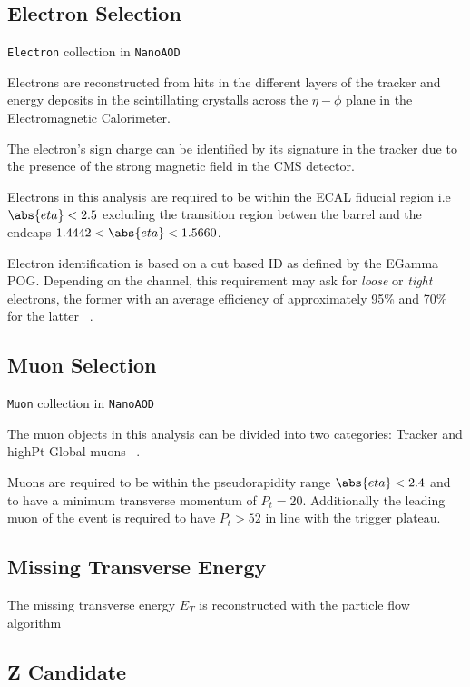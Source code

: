 \subsection{Electron Selection}

\verb|Electron| collection in \verb|NanoAOD|

Electrons are reconstructed from hits in the different
layers of the tracker and energy deposits in the scintillating crystalls
across the $\eta-\phi$ plane in the Electromagnetic Calorimeter.

The electron's sign charge can be identified by its signature in the tracker
due to the presence of the strong magnetic field in the CMS detector.

Electrons in this analysis are required to be within the ECAL fiducial
region i.e $\abs{eta}<2.5$ excluding the transition region betwen the
barrel and the endcaps $1.4442<\abs{eta}<1.5660$.

Electron identification is based on a cut based ID as defined by the
EGamma POG. Depending on the channel, this requirement
may ask for \emph{loose} or \emph{tight} electrons, the former with an
average efficiency of approximately 95\% and 70\% for
the latter ~\cite{EGammaPOG_el}.

\subsection{Muon Selection}

\verb|Muon| collection in \verb|NanoAOD|

The muon objects in this analysis can be divided into two categories:
Tracker and highPt Global muons ~\cite{MuonPOG}.

Muons are required to be within the pseudorapidity range $\abs{eta}<2.4$ and
to have a minimum transverse momentum of $P_t=20$. Additionally the leading muon of
the event is required to have $P_t>52$ in line with the trigger plateau.

\subsection{Missing Transverse Energy}

The missing transverse energy $E_T$ is reconstructed with the particle flow
algorithm ~\cite{particleflow}

\subsection{Z Candidate}


